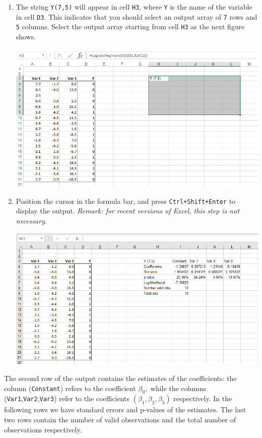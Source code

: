 \documentclass[12pt]{article}
\begin{document}
\begin{enumerate}
\medskip

\item  The string \texttt{Y(7,5)} will appear in cell \texttt{H3}, where \texttt{Y} is the name of the variable in cell \texttt{D3}. This indicates that you should select an output array of \texttt{7} rows and \texttt{5} columns. Select the output array starting from cell \texttt{H3} as the next figure shows.

\medskip

\centerline{\includegraphics[width=6in]{figures/logreg3New}}

\medskip

\item Position the cursor in the formula bar, and press \texttt{Ctrl+Shift+Enter} to display the output. \textit{Remark: for recent versions of Excel, this step is not necessary.}

\medskip

\centerline{\includegraphics[width=6in]{figures/LogRegTrain4}}

\medskip
\end{enumerate}

The second row of the output contains the estimates of the coefficients: the column (\texttt{Constant}) refers to the coefficient $\beta_0,$ while the columns (\texttt{Var1},\texttt{Var2},\texttt{Var3}) refer to the coefficients $(\beta_1,\beta_2,\beta_3)$ respectively. In the following rows we have standard errors and p-values of the estimates. The last two rows contain the number of valid observations and the total number of observations respectively.
\end{document}
